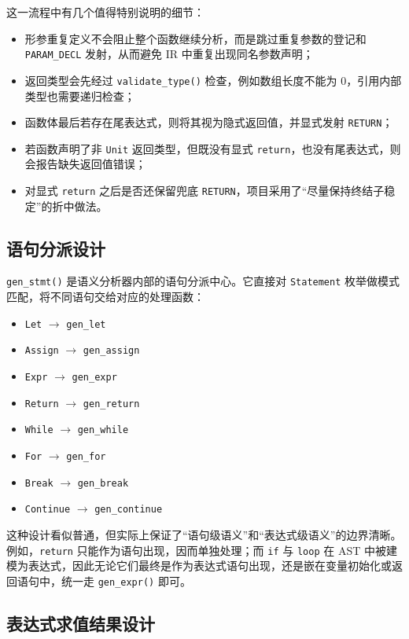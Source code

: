\documentclass[UTF8,a4paper,12pt]{ctexart}
\newcommand{\pkg}[1]{\texttt{#1}}
\newcommand{\op}[1]{\texttt{#1}}
\begin{document}
这一流程中有几个值得特别说明的细节：

\begin{itemize}
    \item 形参重复定义不会阻止整个函数继续分析，而是跳过重复参数的登记和 \op{PARAM\_DECL} 发射，从而避免 IR 中重复出现同名参数声明；
    \item 返回类型会先经过 \pkg{validate\_type()} 检查，例如数组长度不能为 0，引用内部类型也需要递归检查；
    \item 函数体最后若存在尾表达式，则将其视为隐式返回值，并显式发射 \op{RETURN}；
    \item 若函数声明了非 \pkg{Unit} 返回类型，但既没有显式 \pkg{return}，也没有尾表达式，则会报告缺失返回值错误；
    \item 对显式 \pkg{return} 之后是否还保留兜底 \op{RETURN}，项目采用了“尽量保持终结子稳定”的折中做法。
\end{itemize}

\subsection{语句分派设计}

\pkg{gen\_stmt()} 是语义分析器内部的语句分派中心。它直接对 \pkg{Statement} 枚举做模式匹配，将不同语句交给对应的处理函数：

\begin{itemize}
    \item \pkg{Let} $\rightarrow$ \pkg{gen\_let}
    \item \pkg{Assign} $\rightarrow$ \pkg{gen\_assign}
    \item \pkg{Expr} $\rightarrow$ \pkg{gen\_expr}
    \item \pkg{Return} $\rightarrow$ \pkg{gen\_return}
    \item \pkg{While} $\rightarrow$ \pkg{gen\_while}
    \item \pkg{For} $\rightarrow$ \pkg{gen\_for}
    \item \pkg{Break} $\rightarrow$ \pkg{gen\_break}
    \item \pkg{Continue} $\rightarrow$ \pkg{gen\_continue}
\end{itemize}

这种设计看似普通，但实际上保证了“语句级语义”和“表达式级语义”的边界清晰。例如，\pkg{return} 只能作为语句出现，因而单独处理；而 \pkg{if} 与 \pkg{loop} 在 AST 中被建模为表达式，因此无论它们最终是作为表达式语句出现，还是嵌在变量初始化或返回语句中，统一走 \pkg{gen\_expr()} 即可。

\subsection{表达式求值结果设计}
\end{document}
